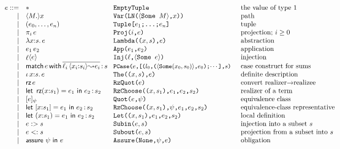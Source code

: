 \documentclass[12pt]{article}
\newcommand{\M}{M}
\newcommand{\e}{e}
\newcommand{\s}{s}
\newcommand{\n}{x} %
\newcommand{\p}{\psi} %
\newcommand{\x}{\n} %
\renewcommand{\l}{{\ell}}
\newcommand{\eThe}[3]{\iota\, #1{:}#2.\,#3}
\newcommand{\eChoose}[5]{\mathsf{let}\ [#1{:}#2] = #3\ \mathsf{in}\ #4\,{:}\,#5}
\newcommand{\eUnit}{\mathsf{*}}
\newcommand{\eTuple}[2]{(#1_0,\ldots,#1_{#2})}
\newcommand{\eProj}[2]{\mathop{\pi_{#1}} #2 }
\newcommand{\eLambda}[3]{\lambda #1{:}#2.\,#3}
\newcommand{\eApp}[2]{#1\,#2}
\newcommand{\eInj}[2]{\mathop{#1} \langle #2 \rangle}
\newcommand{\eRz}[1]{\mathop{\mathsf{rz}} #1}
\newcommand{\eQuotient}[2]{[#1]_{#2}}
\newcommand{\eSubin}[2]{#1 :> #2}
\newcommand{\eSubout}[2]{#1 <: #2}
\newcommand{\eAssure}[2]{\mathsf{assure}\ #1\ \mathsf{in}\ #2}
\newcommand{\eRzChoose}[5]{\mathsf{let}\ \mathop{\mathsf{rz}}(#1{:}#2) = #3\ \mathsf{in}\ #4\,{:}\,#5}
\newcommand{\eLet}[5]{\mathsf{let}\ (\x{:}\s_1) = \e_1\ \mathsf{in}\ \e_2\,{:}\,\s_2}
\begin{document}
\[
\hspace{-1.5cm}
\begin{array}{rl@{\hspace{0.3cm}}l@{\hspace{0.5cm}}l}
\e ::= & \eUnit & \texttt{EmptyTuple} & \mbox{the value of type $1$}\\
|&\langle\M.\rangle\x & \texttt{Var(LN($\langle$Some $\M\rangle$,$\x$))} & \mbox{path}\\
|&\eTuple{\e}{n}&\texttt{Tuple[$\e_1$;\ldots;$\e_n$]}&\mbox{tuple}\\
|&\eProj{i}{\e}&\texttt{Proj($i$,$\e$)}&\mbox{projection; $i\geq 0$}\\
|&\eLambda{\x}{\s}{\e}&\texttt{Lambda(($\x,\s$),$\e$)}&\mbox{abstraction}\\
|&\eApp{\e_1}{\e_2}&\texttt{App($\e_1$,$\e_2$)}&\mbox{application}\\
|&\eInj{\l}{\e}&\texttt{Inj($\l$,$\langle$Some $\e$$\rangle$)}&\mbox{injection}\\
 |&{\mathsf{match}\,\e\,\mathsf{with}\,
      \overline{\l_i\,\langle{\x_i{:}\s_i}\rangle{\leadsto} \e_i}\,{:}\,\s}
     & \texttt{\small PCase($\e$,[($l_0$,($\langle$Some$(\x_0,\s_0)$$\rangle$,$\e_0$);$\cdots$],$\s$)} & \mbox{case construct for sums}\\
|&\eThe{\x}{\s}{\e}&\texttt{The(($\x,\s$),$\e$)}&\mbox{definite description}\\
|&\eRz{\e}&\texttt{RzQuot($\e$)}&\mbox{convert realizer$\to$realizee }\\
|&\eRzChoose{\x}{\s_1}{\e_1}{\e_2}{\s_2}
     &\texttt{RzChoose(($\x,\s_1$),$\e_1$,$\e_2$,$\s_2$)} &
     \mbox{realizer of a term}\\
|&\eQuotient{\e}{\p} & \texttt{Quot($\e$,$\p$)} & \mbox{equivalence class}\\
|&\eChoose{\x}{\s_1}{\e_1}{\e_2}{\s_2}
     &\texttt{RzChoose(($\x,\s_1$),$\p$,$\e_1$,$\e_2$,$\s_2$)} &
     \mbox{equivalence-class representative}\\
|&\eLet{\x}{\s_1}{\e_1}{\e_}{\s_2}
     &\texttt{Let(($\x,\s_1$),$\e_1$,$\e_2$,$\s_2$)} &
     \mbox{local definition}\\
|&\eSubin{\e}{\s}& \texttt{Subin($\e,\s$)} & \mbox{injection into a subset $\s$}\\
|&\eSubout{\e}{\s}& \texttt{Subout($\e,\s$)} & \mbox{projection from a subset into $\s$}\\
 |&\eAssure{\p}{\e}&\texttt{Assure(None,$\p$,$\e$)} & \mbox{obligation}\\
\end{array}
\]
\end{document}
